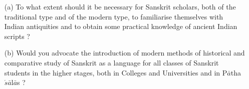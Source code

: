 {\begin{itemize}
\begin{itemize}
           \item[(a)] To what extent should it be necessary for Sanskrit scholars, both of the traditional type and of the modern type, to familiarise themselves with Indian antiquities and to obtain some practical knowledge of ancient Indian scripts ?
           
           \item[(b)] Would you advocate the introduction of modern methods of historical and comparative study of Sanskrit as a language for all classes of Sanskrit students in the higher stages, both in Colleges and Universities and in P$\bar{a}$tha$\acute{s}\bar{a}$l$\bar{a}$s ?
           
           \end{itemize}
\end{itemize}
}

